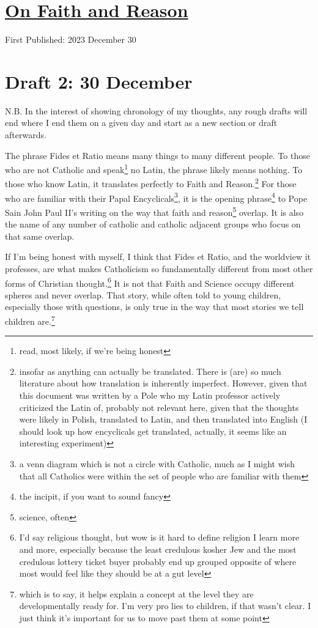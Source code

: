 \documentclass[12pt]{article}[titlepage]
\newcommand{\1}{\={a}}
\newcommand{\2}{\={e}}
\newcommand{\3}{\={\i}}
\newcommand{\4}{\=o}
\newcommand{\5}{\=u}
\newcommand{\6}{\={A}}
\renewcommand{\,}{\textsuperscript{,}}
\begin{document}
\doublespacing
\section{\href{fides-ratio.html}{On Faith and Reason}}
First Published: 2023 December 30

\section{Draft 2: 30 December}
N.B. In the interest of showing chronology of my thoughts, any rough drafts will end where I end them on a given day and start as a new section or draft afterwards.

The phrase Fides et Ratio means many things to many different people.
To those who are not Catholic and speak\footnote{read, most likely, if we're being honest} no Latin, the phrase likely means nothing.
To those who know Latin, it translates perfectly to Faith and Reason.\footnote{insofar as anything can actually be translated. There is (are) so much literature about how translation is inherently imperfect.
However, given that this document was written by a Pole who my Latin professor actively criticized the Latin of, probably not relevant here, given that the thoughts were likely in Polish, translated to Latin, and then translated into English (I should look up how encyclicals get translated, actually, it seems like an interesting experiment)}
For those who are familiar with their Papal Encyclicals\footnote{a venn diagram which is not a circle with Catholic, much as I might wish that all Catholics were within the set of people who are familiar with them}, it is the opening phrase\footnote{the incipit, if you want to sound fancy} to Pope Sain John Paul II's writing on the way that faith and reason\footnote{science, often} overlap.
It is also the name of any number of catholic and catholic adjacent groups who focus on that same overlap.

If I'm being honest with myself, I think that Fides et Ratio, and the worldview it professes, are what makes Catholicism so fundamentally different from most other forms of Christian thought.\footnote{I'd say religious thought, but wow is it hard to define religion I learn more and more, especially because the least credulous kosher Jew and the most credulous lottery ticket buyer probably end up grouped opposite of where most would feel like they should be at a gut level}
It is not that Faith and Science occupy different spheres and never overlap.
That story, while often told to young children, especially those with questions, is only true in the way that most stories we tell children are.\footnote{which is to say, it helps explain a concept at the level they are developmentally ready for. I'm very pro lies to children, if that wasn't clear. I just think it's important for us to move past them at some point}
\end{document}
